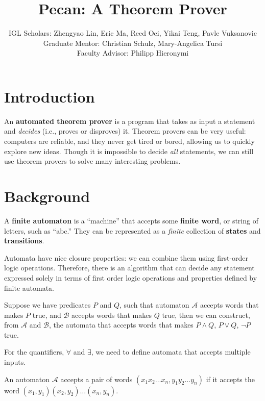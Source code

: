 \documentclass[10pt,usenames,dvipsnames]{article}
\title{Pecan: A Theorem Prover}
\author{%
IGL Scholars: Zhengyao Lin, Eric Ma, Reed Oei, Yikai Teng, Pavle Vuksanovic \\
Graduate Mentor: Christian Schulz, Mary-Angelica Tursi \\
Faculty Advisor: Philipp Hieronymi%
}
\begin{document}
\maketitle


\section{Introduction}

An \textbf{automated theorem prover} is a program that takes as input a statement and \emph{decides} (i.e., proves or disproves) it. 
Theorem provers can be very useful: computers are reliable, and they never get tired or bored, allowing us to quickly explore new ideas.
Though it is impossible to decide \emph{all} statements, we can still use theorem provers to solve many interesting problems. 

\section{Background}

A \textbf{finite automaton} is a ``machine'' that accepts some \textbf{finite word}, or string of letters, such as ``abc.''
They can be represented as a \emph{finite} collection of \textbf{states} and \textbf{transitions}.

Automata have nice closure properties: we can combine them using first-order logic operations.
Therefore, there is an algorithm that can decide any statement expressed solely in terms of first order logic operations and properties defined by finite automata.

\begin{theorem}{\cite{aut_theory}}
    Suppose we have predicates $P$ and $Q$, such that automaton $\mathcal{A}$ accepts words that makes $P$ true, and $\mathcal{B}$ accepts words that makes $Q$ true, then we can construct, from $\mathcal{A}$ and $\mathcal{B}$, the automata that accepts words that makes $P \land Q$, $P \lor Q$, $\lnot P$ true.
\end{theorem}

For the quantifiers, $\forall$ and $\exists$, we need to define automata that accepts multiple inputs. 
\begin{definition}
    An automaton $\mathcal{A}$ accepts a pair of words $ (x_1x_2\dots x_n, y_1y_2\dots y_n)$ if it accepts the word $(x_1,y_1)(x_2,y_2)\dots(x_n,y_n)$.
\end{definition}
\end{document}
